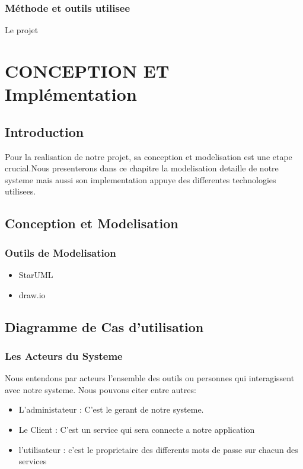 \documentclass[11pt,a4paper]{report}
\begin{document}
 \subsection{Méthode et outils utilisee}
  Le projet
\chapter{CONCEPTION ET Implémentation}
\section*{Introduction}
 Pour la realisation de notre projet, sa conception et modelisation est une etape crucial.Nous presenterons dans ce chapitre la modelisation detaille de notre systeme mais aussi son implementation appuye des differentes technologies utilisees.
 
 \section{Conception et Modelisation}
 \subsection{Outils de Modelisation}
 \begin{itemize}
 \item StarUML
 \item draw.io
 \end{itemize}
 \section{Diagramme de Cas d'utilisation}
 \subsection{Les Acteurs du Systeme}
 Nous entendons par acteurs l'ensemble des outils ou personnes qui interagissent avec notre systeme. Nous pouvons citer entre autres:
 \begin{itemize}
 \item L'administateur : C'est le gerant de notre systeme.
 \item Le Client : C'est un service qui sera connecte a notre application
 \item l'utilisateur : c'est le proprietaire des differents mots de passe sur chacun des services
 \end{itemize}
\end{document}
